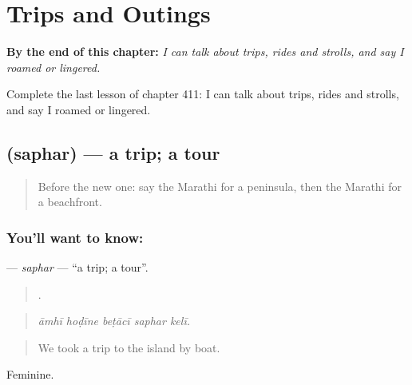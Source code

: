 
\chapter{Trips and Outings}
\label{ch:mr-trips-and-outings}

\begin{chapteropening}
\textbf{By the end of this chapter:} \emph{I can talk about trips, rides and strolls, and say I roamed or lingered.}

Complete the last lesson of chapter 411: I can talk about trips, rides and strolls, and say I roamed or lingered.
\end{chapteropening}

\section[\texorpdfstring{\mr{सफर} (saphar)}{सफर (saphar)}]{ (saphar) — a trip; a tour}

\label{lesson:MR-C411-saphar}



\begin{quote}
Before the new one: say the Marathi for a peninsula, then the Marathi for a beachfront.
\end{quote}

\subsection*{You'll want to know: }
\textbf{} — \emph{saphar} — \textquotedblleft{}a trip; a tour\textquotedblright{}.

\begin{quote}
    .
\end{quote}

\begin{quote}
\emph{āmhī hoḍīne beṭācī saphar kelī.}
\end{quote}

\begin{quote}
We took a trip to the island by boat.
\end{quote}

Feminine.

